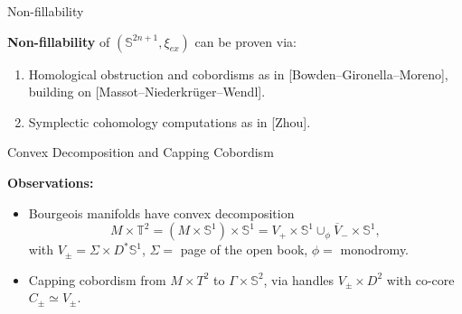 \documentclass{beamer}
\begin{document}
\begin{frame}{Non-fillability}

\textbf{Non-fillability} of $(\mathbb S^{2n+1},\xi_{ex})$ can be proven via:

\begin{enumerate}
    \item Homological obstruction and cobordisms as in [Bowden--Gironella--Moreno], building on [Massot--Niederkr\"uger--Wendl].
    \item Symplectic cohomology computations as in [Zhou].
\end{enumerate}

\end{frame}

\begin{frame}{Convex Decomposition and Capping Cobordism}

\textbf{Observations:} 
\begin{itemize}
    \item Bourgeois manifolds have convex decomposition $$M\times \mathbb T^2=(M\times \mathbb S^1)\times \mathbb S^1= V_+\times \mathbb S^1 \cup_\phi \overline{V}_-\times \mathbb S^1,$$ with $V_\pm=\Sigma \times D^*\mathbb S^1$, $\Sigma=$ page of the open book, $\phi=$ monodromy.
    
    \pause
    
    \item Capping cobordism from $M\times T^2$ to $\Gamma\times \mathbb S^2$, via handles $V_\pm \times D^2$ with co-core $C_\pm \simeq V_\pm$.
\end{itemize}
\end{frame}
\end{document}
